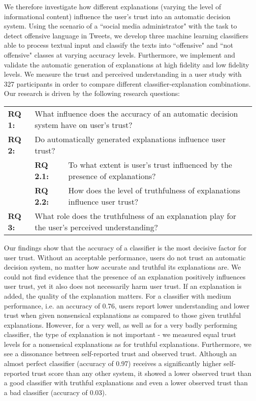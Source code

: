 We therefore investigate how different explanations (varying the level of informational content) influence the user's trust into an automatic decision system. Using the scenario of a ``social media administrator" with the task to detect offensive language in Tweets, we develop three machine learning classifiers able to process textual input and classify the texts into ``offensive" and ``not offensive" classes at varying accuracy levels. Furthermore, we implement and validate the automatic generation of explanations at high fidelity and low fidelity levels. We measure the trust and perceived understanding in a user study with 327 participants in order to compare different classifier-explanation combinations. Our research is driven by the following research questions:
\begin{table}[H]
	\centering
	\begin{tabular}{llp{8.5cm}}
		\textbf{RQ 1:} & \multicolumn{2}{p{10cm}}{What influence does the accuracy of an automatic decision system have on user's trust?} \\
		\textbf{RQ 2:} & \multicolumn{2}{p{10cm}}{Do automatically generated explanations influence user trust?} \\
		& \textbf{RQ 2.1:} & To what extent is user's trust influenced by the presence of explanations?\\
		& \textbf{RQ 2.2:} & How does the level of truthfulness of explanations influence user trust?\\
		\textbf{RQ 3:} & \multicolumn{2}{p{10cm}}{What role does the truthfulness of an explanation play for the user's perceived understanding?} \\
	\end{tabular}
\end{table}
\noindent Our findings show that the accuracy of a classifier is the most decisive factor for user trust. Without an acceptable performance, users do not trust an automatic decision system, no matter how accurate and truthful its explanations are. We could not find evidence that the presence of an explanation positively influences user trust, yet it also does not necessarily harm user trust. If an explanation is added, the quality of the explanation matters. For a classifier with medium performance, i.e. an accuracy of 0.76, users report lower understanding and lower trust when given nonsensical explanations as compared to those given truthful explanations. However, for a very well, as well as for a very badly performing classifier, the type of explanation is not important - we measured equal trust levels for a nonsensical explanations as for truthful explanations. Furthermore, we see a dissonance between self-reported trust and observed trust. Although an almost perfect classifier (accuracy of 0.97) receives a significantly higher self-reported trust score than any other system, it showed a lower observed trust than a good classifier with truthful explanations and even a lower observed trust than a bad classifier (accuracy of 0.03).\newline
